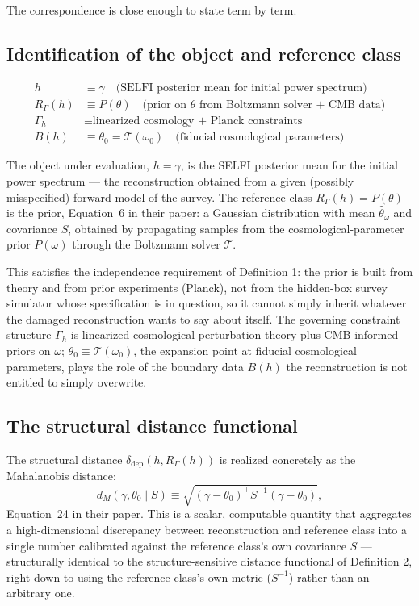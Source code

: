 \documentclass[11pt]{article}
\newcommand{\RGam}{R_\Gamma}
\newcommand{\ddep}{\delta_{\mathrm{dep}}}
\begin{document}
The correspondence is close enough to state term by term.

\subsection{Identification of the object and reference class}

\begin{align*}
h &\equiv \gamma \quad \text{(SELFI posterior mean for initial power spectrum)} \\
\RGam(h) &\equiv P(\theta) \quad \text{(prior on $\theta$ from Boltzmann solver + CMB data)} \\
\Gamma_h &\equiv \text{linearized cosmology + Planck constraints} \\
B(h) &\equiv \theta_0 = \mathcal{T}(\omega_0) \quad \text{(fiducial cosmological parameters)}
\end{align*}

The object under evaluation, $h = \gamma$, is the SELFI posterior mean for the initial power spectrum --- the reconstruction obtained from a given (possibly misspecified) forward model of the survey. The reference class $\RGam(h) = P(\theta)$ is the prior, Equation~6 in their paper: a Gaussian distribution with mean $\hat\theta_\omega$ and covariance $S$, obtained by propagating samples from the cosmological-parameter prior $P(\omega)$ through the Boltzmann solver $\mathcal{T}$.

This satisfies the independence requirement of Definition 1: the prior is built from theory and from prior experiments (Planck), not from the hidden-box survey simulator whose specification is in question, so it cannot simply inherit whatever the damaged reconstruction wants to say about itself. The governing constraint structure $\Gamma_h$ is linearized cosmological perturbation theory plus CMB-informed priors on $\omega$; $\theta_0 \equiv \mathcal{T}(\omega_0)$, the expansion point at fiducial cosmological parameters, plays the role of the boundary data $B(h)$ the reconstruction is not entitled to simply overwrite.

\subsection{The structural distance functional}

The structural distance $\ddep(h, \RGam(h))$ is realized concretely as the Mahalanobis distance:
\[
d_M(\gamma,\theta_0\mid S) \equiv \sqrt{(\gamma-\theta_0)^\top S^{-1} (\gamma-\theta_0)},
\]
Equation~24 in their paper. This is a scalar, computable quantity that aggregates a high-dimensional discrepancy between reconstruction and reference class into a single number calibrated against the reference class's own covariance $S$ --- structurally identical to the structure-sensitive distance functional of Definition 2, right down to using the reference class's own metric ($S^{-1}$) rather than an arbitrary one.
\end{document}
